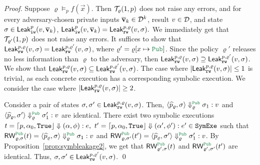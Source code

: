 \begin{proof}
Suppose $\varrho\models_p f(\vec{x})$. Then $\mathcal{T}_\varrho(1,p)$ does not raise any errors,
 and for every adversary-chosen private inputs $\overline{\bf{v}}_k\in\mathcal{D}^k$, result $v\in\mathcal{D}$,
and state $\sigma\in{\sf Leak}_{\tt iw}^p(v,\overline{\bf{v}}_k)$,
${\sf Leak}_{\tt iw}^p(v,\overline{\bf{v}}_k)={\sf Leak}_{\tt rw}^{p,\varrho}(v,\sigma).$
We immediately get that $\mathcal{T}_{\varrho'}(1,p)$ does not raise any errors.
It suffices to show that ${\sf Leak}_{\tt rw}^{p,\varrho}(v,\sigma)={\sf Leak}_{\tt rw}^{p,\varrho'}(v,\sigma)$, where
$\varrho'=\varrho[x\mapsto \Pub]$.
Since the policy $\varrho'$ releases no less information than $\varrho$ to the adversary, then
${\sf Leak}_{\tt rw}^{p,\varrho}(v,\sigma)\supseteq{\sf Leak}_{\tt rw}^{p,\varrho'}(v,\sigma)$. %
We show that ${\sf Leak}_{\tt rw}^{p,\varrho}(v,\sigma)\subseteq{\sf Leak}_{\tt rw}^{p,\varrho'}(v,\sigma)$.
The case where $|{\sf Leak}_{\tt rw}^{p,\varrho}(v,\sigma)|\leq 1$ is trivial, as each concrete
execution has a corresponding symbolic execution. We consider the case where $|{\sf Leak}_{\tt rw}^{p,\varrho}(v,\sigma)|\geq 2$.

Consider a pair of states $\sigma,\sigma'\in{\sf Leak}_{\tt rw}^{p,\varrho}(v,\sigma)$.
Then, $\MPCAngle{\widehat{p}_{\varrho},\sigma}\Downarrow_{\varrho}^{\Pub} \sigma_1:v$
and $\MPCAngle{\widehat{p}_{\varrho},\sigma'}\Downarrow_{\varrho}^{\Pub} \sigma_1':v$ are identical.
There exist two symbolic executions $t=\lceil{p, \alpha_0,{\tt True}}\rfloor\Downarrow
(\alpha,\phi):e, \ t'=\lceil{p, \alpha_0,{\tt True}}\rfloor\Downarrow
(\alpha',\phi'):e'\in{\tt SymExe}$
such that $\RW_{\varrho,\sigma}^{\Pub}(t) = \MPCAngle{\widehat{p}_{\varrho},\sigma}\Downarrow_{\varrho}^{\Pub} \sigma_1:v$ and
$\RW_{\varrho,\sigma'}^{\Pub}(t')=\MPCAngle{\widehat{p}_{\varrho},\sigma'}\Downarrow_{\varrho}^{\Pub} \sigma_1':v$.
By Proposition~\ref{prop:symbleakage2}, we get that
 $\RW_{\varrho',\sigma}^{\Pub}(t)$ and $\RW_{\varrho',\sigma'}^{\Pub}(t')$ are identical.
Thus, $\sigma,\sigma'\in{\sf Leak}_{\tt rw}^{p,\varrho'}(v,\sigma)$.
\qed
\end{proof}

